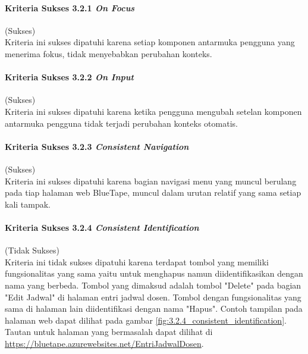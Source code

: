 \documentclass[a4paper,twoside]{article}
\begin{document}
\begin{enumerate}
		\paragraph{Kriteria Sukses 3.2.1 \textit{On Focus}}
		\label{par:kepatuhan_bluetape_kriteria_sukses_3.2.1}
		(Sukses)\\

		Kriteria ini sukses dipatuhi karena setiap komponen antarmuka pengguna yang menerima fokus, tidak menyebabkan perubahan konteks.

		\paragraph{Kriteria Sukses 3.2.2 \textit{On Input}}
		\label{par:kepatuhan_bluetape_kriteria_sukses_3.2.2}
		(Sukses)\\

		Kriteria ini sukses dipatuhi karena ketika pengguna mengubah setelan komponen antarmuka pengguna tidak terjadi perubahan konteks otomatis.

		\paragraph{Kriteria Sukses 3.2.3 \textit{Consistent Navigation}}
		\label{par:kepatuhan_bluetape_kriteria_sukses_3.2.3}
		(Sukses)\\

		Kriteria ini sukses dipatuhi karena bagian navigasi menu yang muncul berulang pada tiap halaman web BlueTape, muncul dalam urutan relatif yang sama setiap kali tampak.

		\paragraph{Kriteria Sukses 3.2.4 \textit{Consistent Identification}}
		\label{par:kepatuhan_bluetape_kriteria_sukses_3.2.4}
		(Tidak Sukses)\\

		Kriteria ini tidak sukses dipatuhi karena terdapat tombol yang memiliki fungsionalitas yang sama yaitu untuk menghapus namun diidentifikasikan dengan nama yang berbeda. Tombol yang dimaksud adalah tombol "Delete" pada bagian "Edit Jadwal" di halaman entri jadwal dosen. Tombol dengan fungsionalitas yang sama di halaman lain diidentifikasi dengan nama "Hapus". Contoh tampilan pada halaman web dapat dilihat pada gambar \ref{fig:3.2.4_consistent_identification}. Tautan untuk halaman yang bermasalah dapat dilihat di \url{https://bluetape.azurewebsites.net/EntriJadwalDosen}.


\end{enumerate}
\end{document}
